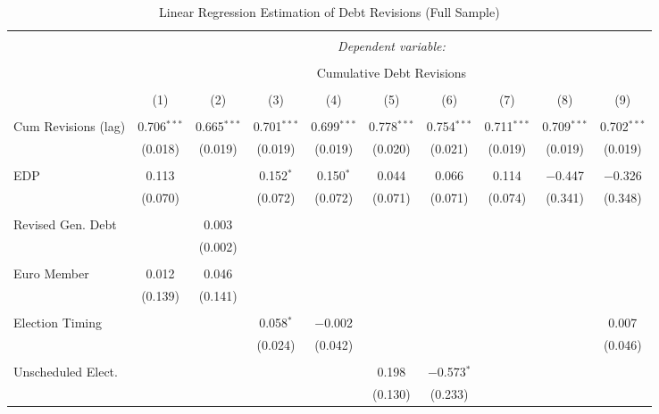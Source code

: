 
\begin{table}[!htbp] \centering 
  \caption{Linear Regression Estimation of Debt Revisions (Full Sample)} 
  \label{debt_results} 
\tiny 
\begin{tabular}{@{\extracolsep{5pt}}lccccccccc} 
\\[-1.8ex]\hline 
\hline \\[-1.8ex] 
 & \multicolumn{9}{c}{\textit{Dependent variable:}} \\ 
\cline{2-10} 
\\[-1.8ex] & \multicolumn{9}{c}{Cumulative Debt Revisions} \\ 
\\[-1.8ex] & (1) & (2) & (3) & (4) & (5) & (6) & (7) & (8) & (9)\\ 
\hline \\[-1.8ex] 
 Cum Revisions (lag) & 0.706$^{***}$ & 0.665$^{***}$ & 0.701$^{***}$ & 0.699$^{***}$ & 0.778$^{***}$ & 0.754$^{***}$ & 0.711$^{***}$ & 0.709$^{***}$ & 0.702$^{***}$ \\ 
  & (0.018) & (0.019) & (0.019) & (0.019) & (0.020) & (0.021) & (0.019) & (0.019) & (0.019) \\ 
  & & & & & & & & & \\ 
 EDP & 0.113 &  & 0.152$^{*}$ & 0.150$^{*}$ & 0.044 & 0.066 & 0.114 & $-$0.447 & $-$0.326 \\ 
  & (0.070) &  & (0.072) & (0.072) & (0.071) & (0.071) & (0.074) & (0.341) & (0.348) \\ 
  & & & & & & & & & \\ 
 Revised Gen. Debt &  & 0.003 &  &  &  &  &  &  &  \\ 
  &  & (0.002) &  &  &  &  &  &  &  \\ 
  & & & & & & & & & \\ 
 Euro Member & 0.012 & 0.046 &  &  &  &  &  &  &  \\ 
  & (0.139) & (0.141) &  &  &  &  &  &  &  \\ 
  & & & & & & & & & \\ 
 Election Timing &  &  & 0.058$^{*}$ & $-$0.002 &  &  &  &  & 0.007 \\ 
  &  &  & (0.024) & (0.042) &  &  &  &  & (0.046) \\ 
  & & & & & & & & & \\ 
 Unscheduled Elect. &  &  &  &  & 0.198 & $-$0.573$^{*}$ &  &  &  \\ 
  &  &  &  &  & (0.130) & (0.233) &  &  &  \\ 

\end{tabular}
\end{table}

